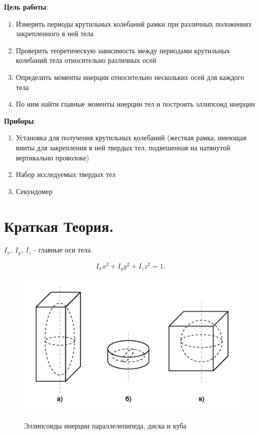 \documentclass[a4paper,12pt]{article} %
\begin{document}

\textbf{Цель работы}:
\begin{enumerate}
\item Измерить периоды крутильных колебаний рамки при различных положениях закрепленного в ней тела
\item Проверить теорети­ческую зависимость между периодами крутильных колебаний тела относительно различных осей
\item Определить моменты инерции относи­тельно нескольких осей для каждого тела
\item По ним найти главные моменты инерции тел и построить эллипсоид инерции
\end{enumerate}

\textbf{Приборы}:
\begin{enumerate}
\item Установка для получения крутильных колебаний (жесткая рамка, имеющая винты для закрепления в ней твердых тел, подвешенная на натянутой вертикально проволоке)
\item На­бор исследуемых твердых тел
\item Секундомер
\end{enumerate}

\section{Краткая Теория.}

$I_x,\ I_y,\ I_z$ - главные оси тела.

\begin{equation} I_x x^2 + I_y y^2 + I_z z^2 = 1. \label{eq:1} \end{equation}

\begin{figure} [H] \center
	\includegraphics[scale = 1]{data/рис. 1.png}
	\label{pic:1} \caption[Рис. 1]{Эллипсоиды инерции параллелепипеда, диска и куба}
\end{figure}
\end{document}
